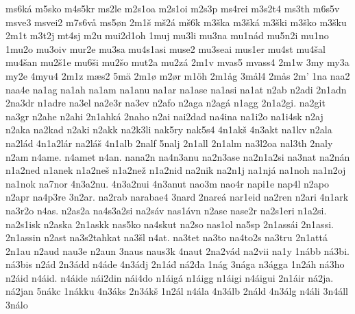 {    ms6ká
    m5sko
    m4s5kr
    ms2le
    m2s1oa
    m2s1oi
    m2s3p
    ms4rei
    m3s2t4
    ms3th
    m6s5v
    msve3
    msvei2
    m7s6vå
    ms5øn
    2m1š
    mš2á
    mš6k
    m3ška
    m3šká
    m3ški
    m3ško
    m3šku
    2m1t
    m3t2j
    mt4sj
    m2u
    mui2d1oh
    1muj
    mu3li
    mu3na
    mu1nád
    mu5n2i
    mu1no
    1mu2o
    mu3oiv
    mur2e
    mu3sa
    mu4s1asi
    muse2
    mu3seai
    mus1er
    mu4st
    mu4šal
    mu4šan
    mu2š1e
    mu6ši
    mu2šo
    mut2a
    mu2zá
    2m1v
    mvas5
    mvass4
    2m1w
    3my
    my3a
    my2e
    4myu4
    2m1z
    mæs2
    5mä
    2m1ø
    m2ør
    m1öh
    2m1åg
    3mål4
    2mås
    2m'
    1na
    naa2
    naa4e
    na1ag
    na1ah
    na1am
    na1anu
    na1ar
    na1ase
    na1asi
    na1at
    n2ab
    n2adi
    2n1adn
    2na3dr
    n1adre
    na3el
    na2e3r
    na3ev
    n2afo
    n2aga
    n2agá
    n1agg
    2n1a2gi.
    na2git
    na3gr
    n2ahe
    n2ahi
    2n1ahká
    2naho
    n2ai
    nai2dad
    na4ina
    na1i2o
    na1i4sk
    n2aj
    n2aka
    na2kad
    n2aki
    n2akk
    na2k3li
    nak5ry
    nak5s4
    4n1akš
    4n3akt
    na1kv
    n2ala
    na2lád
    4n1a2lár
    na2láš
    4n1alb
    2nalf
    5nalj
    2n1all
    2n1alm
    na3l2oa
    nal3th
    2naly
    n2am
    n4ame.
    n4amet
    n4an.
    nana2n
    na4n3anu
    na2n3ase
    na2n1a2si
    na3nat
    na2nán
    n1a2ned
    n1anek
    n1a2neš
    n1a2než
    n1a2nid
    na2nik
    na2n1j
    na1njá
    na1noh
    na1n2oj
    na1nok
    na7nor
    4n3a2nu.
    4n3a2nui
    4n3anut
    nao3m
    nao4r
    napi1e
    nap4l
    n2apo
    n2apr
    na4p3re
    3n2ar.
    na2rab
    narabae4
    3nard
    2nareá
    nar1eid
    na2ren
    n2ari
    4n1ark
    na3r2o
    n4as.
    n2as2a
    na4s3a2si
    na2sáv
    nas1ávn
    n2ase
    nase2r
    na2s1eri
    n1a2si.
    na2s1isk
    n2aska
    2n1askk
    nas5ko
    na4skut
    na2so
    nas1ol
    na5sp
    2n1assái
    2n1assi.
    2n1assin
    n2ast
    na3s2tahkat
    na3šl
    n4at.
    na3tet
    na3to
    na4to2s
    na3tru
    2n1attá
    2n1au
    n2aud
    nau3e
    n2aun
    3naus
    naus3k
    4naut
    2na2vád
    na2vii
    na1y
    1nább
    ná3bi.
    ná3bis
    n2ád
    2n3ádd
    n4áde
    4n3ádj
    2n1áđ
    ná2đa
    1nág
    3nága
    n3ágga
    1n2áh
    ná3ho
    n2áid
    n4áid.
    n4áide
    nái2din
    nái4do
    n1áigá
    n1áigg
    n1áigi
    n4áigui
    2n1áir
    ná2ja.
    ná2jan
    5nákc
    1nákku
    4n3áks
    2n3ákš
    1n2ál
    n4ála
    4n3álb
    2náld
    4n3álg
    n4áli
    3n4áll
    3nálo
}
